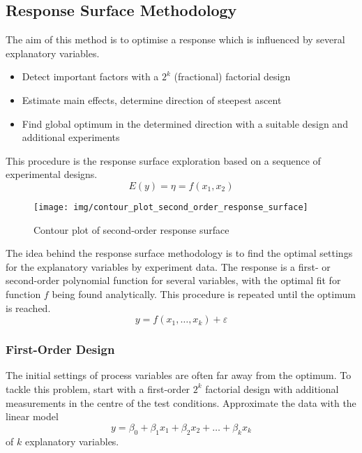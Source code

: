\documentclass[11pt]{article}
\theoremstyle{definition}
\begin{document}
\subsection{Response Surface Methodology}
The aim of this method is to optimise a response which is influenced by several explanatory variables.
\begin{itemize}
	\item Detect important factors with a $2^k$ (fractional) factorial design
	\item Estimate main effects, determine direction of steepest ascent
	\item Find global optimum in the determined direction with a suitable design and additional experiments
\end{itemize}
This procedure is the response surface exploration based on a sequence of experimental designs.
\begin{equation*}
	E(y) = \eta = f(x_1, x_2)
\end{equation*}

\begin{figure}[tbh]
	\centering
	\texttt{[image: img/contour\_plot\_second\_order\_response\_surface]}
	\caption{Contour plot of second-order response surface}
	\label{fig:contourplotsecondorderresponsesurface}
\end{figure}

The idea behind the response surface methodology is to find the optimal settings for the explanatory variables by experiment data. The response is a first- or second-order polynomial function for several variables, with the optimal fit for function $f$ being found analytically. This procedure is repeated until the optimum is reached.
\begin{equation*} 
	y=f(x_1,\dots,x_k) + \varepsilon \tag{fit response function}
\end{equation*}

\subsubsection{First-Order Design}
The initial settings of process variables are often far away from the optimum. To tackle this problem, start with a first-order $2^k$ factorial design with additional measurements in the centre of the test conditions. Approximate the data with the linear model
\begin{equation*}
	y = \beta_0 + \beta_1 x_1 + \beta_2 x_2 + \dots + \beta_k x_k
\end{equation*}
of $k$ explanatory variables.
\end{document}
